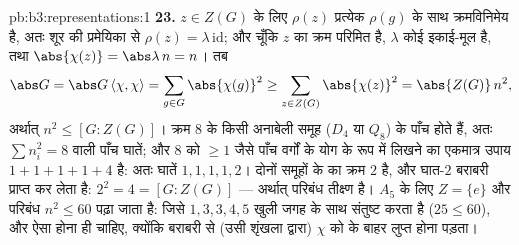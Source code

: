 \begin{solution}{pb:b3:representations:1}
\textbf{23.} $z \in Z(G)$ के लिए $\rho(z)$ प्रत्येक $\rho(g)$ के साथ क्रमविनिमेय
है, अतः शूर की प्रमेयिका से $\rho(z) = \lambda\,
\mathrm{id}$; और चूँकि $z$ का क्रम परिमित
है, $\lambda$ कोई इकाई-मूल है, तथा $\abs{\chi(z)} = \abs\lambda\,n = n$। तब
\[
\abs G = \abs G\,\langle\chi, \chi\rangle
= \sum_{g \in G}\abs{\chi(g)}^2
\geq \sum_{z \in Z(G)}\abs{\chi(z)}^2
= \abs{Z(G)}\,n^2,
\]
अर्थात् $n^2 \leq [G : Z(G)]$। क्रम $8$ के किसी अनाबेली समूह ($D_4$ या $Q_8$) के
पाँच  होते हैं, अतः $\sum n_i^2 = 8$ वाली पाँच  घातें; और
$8$ को $\geq 1$ जैसे पाँच वर्गों के योग के रूप में लिखने का एकमात्र
उपाय $1 + 1 + 1 + 1
+ 4$ है: अतः घातें $1, 1, 1, 1, 2$। दोनों समूहों के  का क्रम $2$
है, और घात-$2$  बराबरी प्राप्त कर लेता है: $2^2 = 4 = [G : Z(G)]$ --- अर्थात्
परिबंध तीक्ष्ण है। $A_5$ के लिए $Z = \{e\}$ और परिबंध $n^2 \leq 60$ पढ़ा जाता है:
जिसे $1, 3, 3, 4, 5$ खुली जगह के साथ संतुष्ट करता है ($25 \leq 60$), और ऐसा होना ही
चाहिए, क्योंकि बराबरी से (उसी शृंखला द्वारा) $\chi$ को  के
बाहर लुप्त होना पड़ता।


\end{solution}
